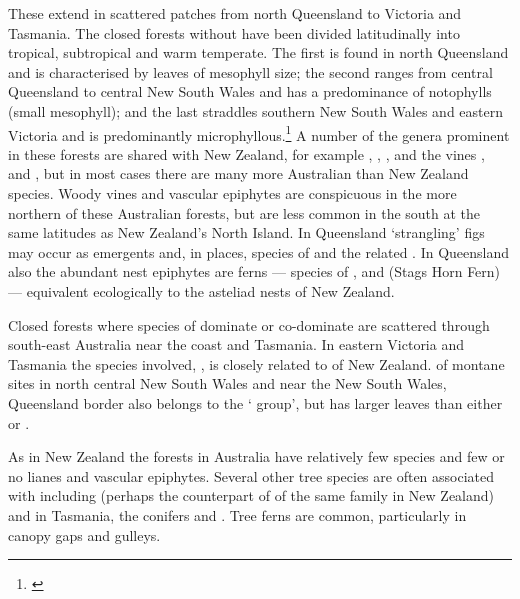 These extend in scattered patches from north Queensland to Victoria and Tasmania.
The closed forests without  have been divided latitudinally into tropical, subtropical and warm temperate.
The first is found in north Queensland and is characterised by leaves of mesophyll size; the second ranges from central Queensland to central New South Wales and has a predominance of notophylls (small mesophyll); and the last straddles southern New South Wales and eastern Victoria and is predominantly microphyllous.\footnote{\cite{webb1959physiognomic}}
A number of the genera prominent in these forests are shared with New Zealand, for example , , ,  and the vines ,  and , but in most cases there are many more Australian than New Zealand species.
Woody vines and vascular epiphytes are conspicuous in the more northern of these Australian forests, but are less common in the south at the same latitudes as New Zealand's North Island.
In Queensland `strangling' figs may occur as emergents and, in places, species of  and the related .
In Queensland also the abundant nest epiphytes are ferns --- species of ,  and  (Stags Horn Fern) --- equivalent ecologically to the asteliad nests of New Zealand.

Closed forests where species of  dominate or co-dominate are scattered through south-east Australia near the coast and Tasmania.
In eastern Victoria and Tasmania the species involved, , is closely related to  of New Zealand.  of montane sites in north central New South Wales and near the New South Wales, Queensland border also belongs to the ` group', but has larger leaves than either  or .

As in New Zealand the  forests in Australia have relatively few species and few or no lianes and vascular epiphytes.
Several other tree species are often associated with  including  (perhaps the counterpart of  of the same family in New Zealand)  and in Tasmania, the conifers  and .
Tree ferns are common, particularly in canopy gaps and gulleys.

